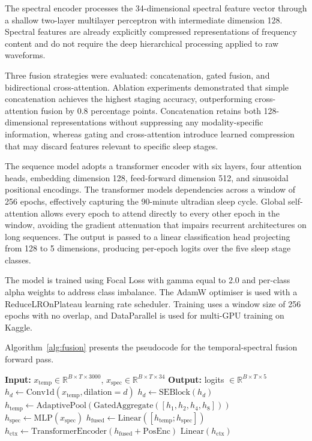 The spectral encoder processes the 34-dimensional spectral feature vector through a shallow two-layer multilayer perceptron with intermediate dimension 128. Spectral features are already explicitly compressed representations of frequency content and do not require the deep hierarchical processing applied to raw waveforms.

Three fusion strategies were evaluated: concatenation, gated fusion, and bidirectional cross-attention. Ablation experiments demonstrated that simple concatenation achieves the highest staging accuracy, outperforming cross-attention fusion by 0.8 percentage points. Concatenation retains both 128-dimensional representations without suppressing any modality-specific information, whereas gating and cross-attention introduce learned compression that may discard features relevant to specific sleep stages.

The sequence model adopts a transformer encoder \cite{vaswani2017attention} with six layers, four attention heads, embedding dimension 128, feed-forward dimension 512, and sinusoidal positional encodings. The transformer models dependencies across a window of 256 epochs, effectively capturing the 90-minute ultradian sleep cycle. Global self-attention allows every epoch to attend directly to every other epoch in the window, avoiding the gradient attenuation that impairs recurrent architectures on long sequences. The output is passed to a linear classification head projecting from 128 to 5 dimensions, producing per-epoch logits over the five sleep stage classes.

The model is trained using Focal Loss \cite{lin2017focal} with gamma equal to 2.0 and per-class alpha weights to address class imbalance. The AdamW optimiser \cite{loshchilov2017adamw} is used with a ReduceLROnPlateau learning rate scheduler. Training uses a window size of 256 epochs with no overlap, and DataParallel is used for multi-GPU training on Kaggle.

Algorithm~\ref{alg:fusion} presents the pseudocode for the temporal-spectral fusion forward pass.

\begin{algorithm}[h]
\caption{Temporal-Spectral Fusion Forward Pass}\label{alg:fusion}
\begin{algorithmic}[1]
\State \textbf{Input:} $x_{\text{temp}} \in \mathbb{R}^{B \times T \times 3000}$, $x_{\text{spec}} \in \mathbb{R}^{B \times T \times 34}$
\State \textbf{Output:} logits $\in \mathbb{R}^{B \times T \times 5}$
    \State $h_d \gets \text{Conv1d}(x_{\text{temp}}, \text{dilation}=d)$
    \State $h_d \gets \text{SEBlock}(h_d)$
\EndFor
\State $h_{\text{temp}} \gets \text{AdaptivePool}(\text{GatedAggregate}([h_1, h_2, h_4, h_8]))$
\State $h_{\text{spec}} \gets \text{MLP}(x_{\text{spec}})$
\State $h_{\text{fused}} \gets \text{Linear}([h_{\text{temp}}; h_{\text{spec}}])$
\State $h_{\text{ctx}} \gets \text{TransformerEncoder}(h_{\text{fused}} + \text{PosEnc})$
\State \Return $\text{Linear}(h_{\text{ctx}})$
\end{algorithmic}
\end{algorithm}

